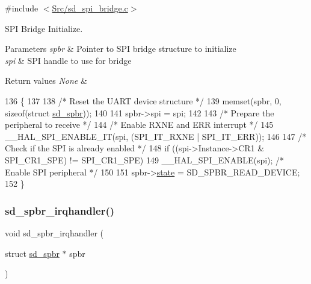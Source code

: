 {\ttfamily \#include $<$\mbox{\hyperlink{sd__spi__bridge_8c}{Src/sd\+\_\+spi\+\_\+bridge.\+c}}$>$}



S\+PI Bridge Initialize. 


\begin{DoxyParams}{Parameters}
{\em spbr} & Pointer to S\+PI bridge structure to initialize \\
\hline
{\em spi} & S\+PI handle to use for bridge \\
\hline
\end{DoxyParams}

\begin{DoxyRetVals}{Return values}
{\em None} & \\
\hline
\end{DoxyRetVals}

\begin{DoxyCode}
136 \{
137 
138     \textcolor{comment}{/* Reset the UART device structure */}
139     memset(spbr, 0, \textcolor{keyword}{sizeof}(\textcolor{keyword}{struct} \mbox{\hyperlink{structsd__spbr}{sd\_spbr}}));
140     
141     spbr->spi = spi;
142 
143     \textcolor{comment}{/* Prepare the peripheral to receive */}
144     \textcolor{comment}{/* Enable RXNE and ERR interrupt */}
145     \_\_HAL\_SPI\_ENABLE\_IT(spi, (SPI\_IT\_RXNE | SPI\_IT\_ERR));
146 
147     \textcolor{comment}{/* Check if the SPI is already enabled */}
148     \textcolor{keywordflow}{if} ((spi->Instance->CR1 & SPI\_CR1\_SPE) != SPI\_CR1\_SPE)
149         \_\_HAL\_SPI\_ENABLE(spi);         \textcolor{comment}{/* Enable SPI peripheral */}
150 
151     spbr->\mbox{\hyperlink{structsd__spbr_a15ddc1ec640d62f5f08410710d83de8a}{state}} = SD\_SPBR\_READ\_DEVICE;
152 \}
\end{DoxyCode}
\mbox{\label{group___s_d___s_p_i___bridge_ga0ce7728ffce92e9931c22b9c54675ca7}} 
\subsubsection{\texorpdfstring{sd\+\_\+spbr\+\_\+irqhandler()}{sd\_spbr\_irqhandler()}}
{\footnotesize\ttfamily void sd\+\_\+spbr\+\_\+irqhandler (\begin{DoxyParamCaption}\item[{struct \mbox{\hyperlink{structsd__spbr}{sd\+\_\+spbr}} $\ast$}]{spbr }\end{DoxyParamCaption})}




